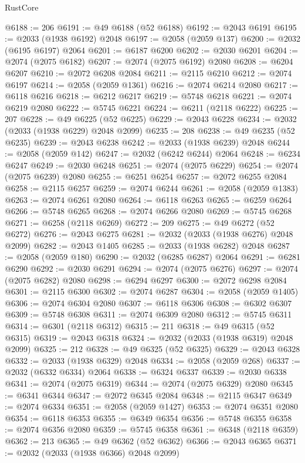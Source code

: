 \begin{lexlean}{RustCore}
\begin{coremodule}
@6188 := 206
@6191 := @49 @6188 (@52 @6188)
@6192 := @2043 @6191
@6195 := @2033 (@1938 @6192) @2048
@6197 := @2058 (@2059 @137)
@6200 := @2032 (@6195 @6197) @2064
@6201 := @6187 @6200
@6202 := @2030 @6201
@6204 := @2074 (@2075 @6182)
@6207 := @2074 (@2075 @6192) @2080
@6208 := @6204 @6207
@6210 := @2072 @6208 @2084
@6211 := @2115 @6210
@6212 := @2074 @6197
@6214 := @2058 (@2059 @1361)
@6216 := @2074 @6214 @2080
@6217 := @6118 @6216
@6218 := @6212 @6217
@6219 := @5748 @6218
@6221 := @2074 @6219 @2080
@6222 := @5745 @6221
@6224 := @6211 (@2118 @6222)
@6225 := 207
@6228 := @49 @6225 (@52 @6225)
@6229 := @2043 @6228
@6234 := @2032 (@2033 (@1938 @6229) @2048 @2099)
@6235 := 208
@6238 := @49 @6235 (@52 @6235)
@6239 := @2043 @6238
@6242 := @2033 (@1938 @6239) @2048
@6244 := @2058 (@2059 @142)
@6247 := @2032 (@6242 @6244) @2064
@6248 := @6234 @6247
@6249 := @2030 @6248
@6251 := @2074 (@2075 @6229)
@6254 := @2074 (@2075 @6239) @2080
@6255 := @6251 @6254
@6257 := @2072 @6255 @2084
@6258 := @2115 @6257
@6259 := @2074 @6244
@6261 := @2058 (@2059 @1383)
@6263 := @2074 @6261 @2080
@6264 := @6118 @6263
@6265 := @6259 @6264
@6266 := @5748 @6265
@6268 := @2074 @6266 @2080
@6269 := @5745 @6268
@6271 := @6258 (@2118 @6269)
@6272 := 209
@6275 := @49 @6272 (@52 @6272)
@6276 := @2043 @6275
@6281 := @2032 (@2033 (@1938 @6276) @2048 @2099)
@6282 := @2043 @1405
@6285 := @2033 (@1938 @6282) @2048
@6287 := @2058 (@2059 @180)
@6290 := @2032 (@6285 @6287) @2064
@6291 := @6281 @6290
@6292 := @2030 @6291
@6294 := @2074 (@2075 @6276)
@6297 := @2074 (@2075 @6282) @2080
@6298 := @6294 @6297
@6300 := @2072 @6298 @2084
@6301 := @2115 @6300
@6302 := @2074 @6287
@6304 := @2058 (@2059 @1405)
@6306 := @2074 @6304 @2080
@6307 := @6118 @6306
@6308 := @6302 @6307
@6309 := @5748 @6308
@6311 := @2074 @6309 @2080
@6312 := @5745 @6311
@6314 := @6301 (@2118 @6312)
@6315 := 211
@6318 := @49 @6315 (@52 @6315)
@6319 := @2043 @6318
@6324 := @2032 (@2033 (@1938 @6319) @2048 @2099)
@6325 := 212
@6328 := @49 @6325 (@52 @6325)
@6329 := @2043 @6328
@6332 := @2033 (@1938 @6329) @2048
@6334 := @2058 (@2059 @268)
@6337 := @2032 (@6332 @6334) @2064
@6338 := @6324 @6337
@6339 := @2030 @6338
@6341 := @2074 (@2075 @6319)
@6344 := @2074 (@2075 @6329) @2080
@6345 := @6341 @6344
@6347 := @2072 @6345 @2084
@6348 := @2115 @6347
@6349 := @2074 @6334
@6351 := @2058 (@2059 @1427)
@6353 := @2074 @6351 @2080
@6354 := @6118 @6353
@6355 := @6349 @6354
@6356 := @5748 @6355
@6358 := @2074 @6356 @2080
@6359 := @5745 @6358
@6361 := @6348 (@2118 @6359)
@6362 := 213
@6365 := @49 @6362 (@52 @6362)
@6366 := @2043 @6365
@6371 := @2032 (@2033 (@1938 @6366) @2048 @2099)

\end{coremodule}
\end{lexlean}
